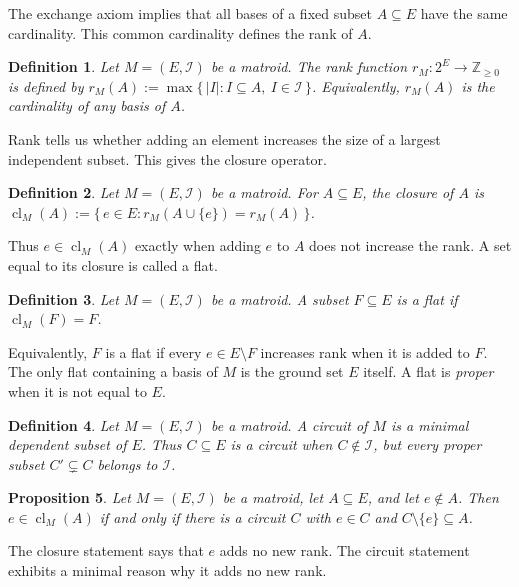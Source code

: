 \documentclass[11pt]{article}
\numberwithin{equation}{section}
\newtheorem{definition}{Definition}[section]
\newtheorem{proposition}[definition]{Proposition}
\theoremstyle{remark}
\newcommand{\cl}{\operatorname{cl}}
\begin{document}
The exchange axiom implies that all bases of a fixed subset $A\subseteq E$
have the same cardinality. This common cardinality defines
the rank of $A$.

\begin{definition}
\label{def:matroid-rank}
Let $M=(E,\mathcal I)$ be a matroid. The rank function $r_M:2^E\to\mathbb Z_{\geq0}$ is defined by $r_M(A):=\max\{\,|I|:I\subseteq A,\ I\in\mathcal I\,\}$. Equivalently, $r_M(A)$ is the cardinality of any basis of $A$.
\end{definition}


Rank tells us whether adding an element increases the size of a largest
independent subset. This gives the closure operator.

\begin{definition}
\label{def:matroid-closure}
Let $M=(E,\mathcal I)$ be a matroid. For $A\subseteq E$, the \emph{closure} of $A$ is $\cl_M(A):=\{\,e\in E:r_M(A\cup\{e\})=r_M(A)\,\}$.
\end{definition}

Thus $e\in\cl_M(A)$ exactly when adding $e$ to $A$ does not increase the rank. A set equal to its closure is called a flat.

\begin{definition}
\label{def:matroid-flat}
Let $M=(E,\mathcal I)$ be a matroid. A subset $F\subseteq E$ is a \emph{flat} if $\cl_M(F)=F$.
\end{definition}

Equivalently, $F$ is a flat if every $e\in E\setminus F$ increases rank when it is added to $F$. The only flat containing a basis of $M$ is the ground set $E$ itself. A flat is \emph{proper} when it is not equal to $E$.


\begin{definition}
\label{def:matroid-circuit}
Let $M=(E,\mathcal I)$ be a matroid. A \emph{circuit} of $M$ is a minimal dependent subset of $E$. Thus $C\subseteq E$ is a circuit when $C\notin\mathcal I$, but every proper subset $C'\subsetneq C$ belongs to $\mathcal I$.
\end{definition}


\begin{proposition}
\label{prop:closure-circuit}
Let $M=(E,\mathcal I)$ be a matroid, let $A\subseteq E$, and let $e\notin A$. Then $e\in\cl_M(A)$ if and only if there is a circuit $C$ with $e\in C$ and $C\setminus\{e\}\subseteq A$.
\end{proposition}

The closure statement says that $e$ adds no new rank. The circuit statement exhibits a minimal reason why it adds no new rank.
\end{document}
